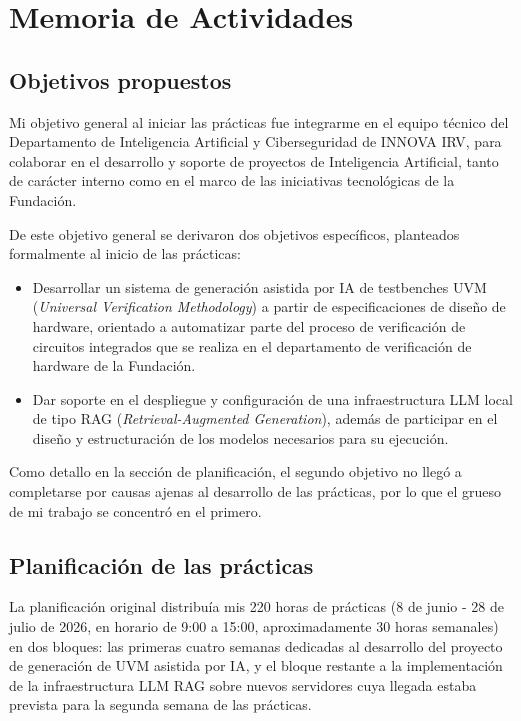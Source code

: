 \chapter{Memoria de Actividades}

\section{Objetivos propuestos}

Mi objetivo general al iniciar las prácticas fue integrarme en el equipo técnico del Departamento de Inteligencia Artificial y Ciberseguridad de INNOVA IRV, para colaborar en el desarrollo y soporte de proyectos de Inteligencia Artificial, tanto de carácter interno como en el marco de las iniciativas tecnológicas de la Fundación.

De este objetivo general se derivaron dos objetivos específicos, planteados formalmente al inicio de las prácticas:

\begin{itemize}
  \item Desarrollar un sistema de generación asistida por IA de testbenches UVM (\emph{Universal Verification Methodology}) a partir de especificaciones de diseño de hardware, orientado a automatizar parte del proceso de verificación de circuitos integrados que se realiza en el departamento de verificación de hardware de la Fundación.
  \item Dar soporte en el despliegue y configuración de una infraestructura LLM local de tipo RAG (\emph{Retrieval-Augmented Generation}), además de participar en el diseño y estructuración de los modelos necesarios para su ejecución.
\end{itemize}

Como detallo en la sección de planificación, el segundo objetivo no llegó a completarse por causas ajenas al desarrollo de las prácticas, por lo que el grueso de mi trabajo se concentró en el primero.

\section{Planificación de las prácticas}

La planificación original distribuía mis 220 horas de prácticas (8 de junio - 28 de julio de 2026, en horario de 9:00 a 15:00, aproximadamente 30 horas semanales) en dos bloques: las primeras cuatro semanas dedicadas al desarrollo del proyecto de generación de UVM asistida por IA, y el bloque restante a la implementación de la infraestructura LLM RAG sobre nuevos servidores cuya llegada estaba prevista para la segunda semana de las prácticas.

